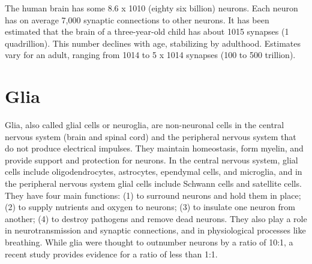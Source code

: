 \documentclass[]{book}
\begin{document}
The human brain has some 8.6 x 1010 (eighty six billion) neurons. Each neuron has on average 7,000 synaptic connections to other neurons. It has been estimated that the brain of a three-year-old child has about 1015 synapses (1 quadrillion). This number declines with age, stabilizing by adulthood. Estimates vary for an adult, ranging from 1014 to 5 x 1014 synapses (100 to 500 trillion).

\hypertarget{glia}{%
\section{Glia}\label{glia}}

Glia, also called glial cells or neuroglia, are non-neuronal cells in the central nervous system (brain and spinal cord) and the peripheral nervous system that do not produce electrical impulses. They maintain homeostasis, form myelin, and provide support and protection for neurons. In the central nervous system, glial cells include oligodendrocytes, astrocytes, ependymal cells, and microglia, and in the peripheral nervous system glial cells include Schwann cells and satellite cells. They have four main functions: (1) to surround neurons and hold them in place; (2) to supply nutrients and oxygen to neurons; (3) to insulate one neuron from another; (4) to destroy pathogens and remove dead neurons. They also play a role in neurotransmission and synaptic connections, and in physiological processes like breathing. While glia were thought to outnumber neurons by a ratio of 10:1, a recent study provides evidence for a ratio of less than 1:1.
\end{document}
